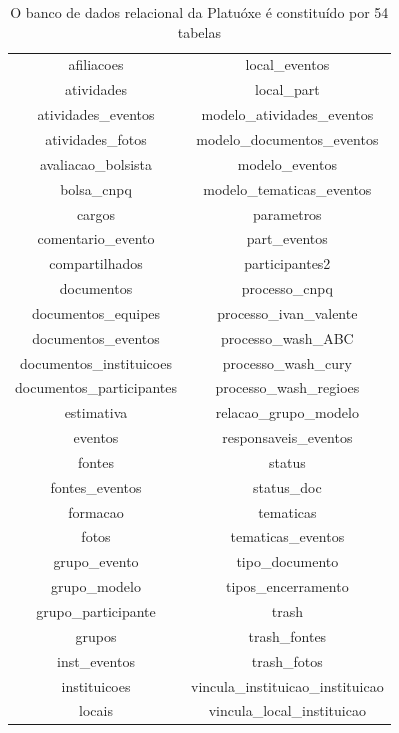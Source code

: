 \begin{table}[htb]
\tiny
\caption{\label{5b2e4ba8f3836249e7dd88b37344da7bfa3669c5}O banco de dados relacional da Platuóxe é constituído por 54 tabelas}

\centering
\begin{tabular}{|c|c|}
\hline
afiliacoes                     &   local\_eventos \\
 atividades                     &   local\_part \\
 atividades\_eventos             &   modelo\_atividades\_eventos \\
 atividades\_fotos               &   modelo\_documentos\_eventos \\
 avaliacao\_bolsista             &   modelo\_eventos \\
 bolsa\_cnpq                     &   modelo\_tematicas\_eventos \\
 cargos                         &   parametros \\
 comentario\_evento              &   part\_eventos \\
 compartilhados                 &   participantes2 \\
 documentos                     &   processo\_cnpq \\
 documentos\_equipes             &   processo\_ivan\_valente \\
 documentos\_eventos             &   processo\_wash\_ABC \\
 documentos\_instituicoes        &   processo\_wash\_cury \\
 documentos\_participantes       &   processo\_wash\_regioes \\
 estimativa                     &   relacao\_grupo\_modelo \\
 eventos                        &   responsaveis\_eventos \\
 fontes                         &   status \\
 fontes\_eventos                 &   status\_doc \\
 formacao                       &   tematicas \\
 fotos                          &   tematicas\_eventos \\
 grupo\_evento                   &   tipo\_documento \\
 grupo\_modelo                   &   tipos\_encerramento \\
 grupo\_participante             &   trash \\
 grupos                         &   trash\_fontes \\
 inst\_eventos                   &   trash\_fotos \\
 instituicoes                   &   vincula\_instituicao\_instituicao \\
 locais                         &   vincula\_local\_instituicao \\
\hline
\end{tabular}
\end{table}


